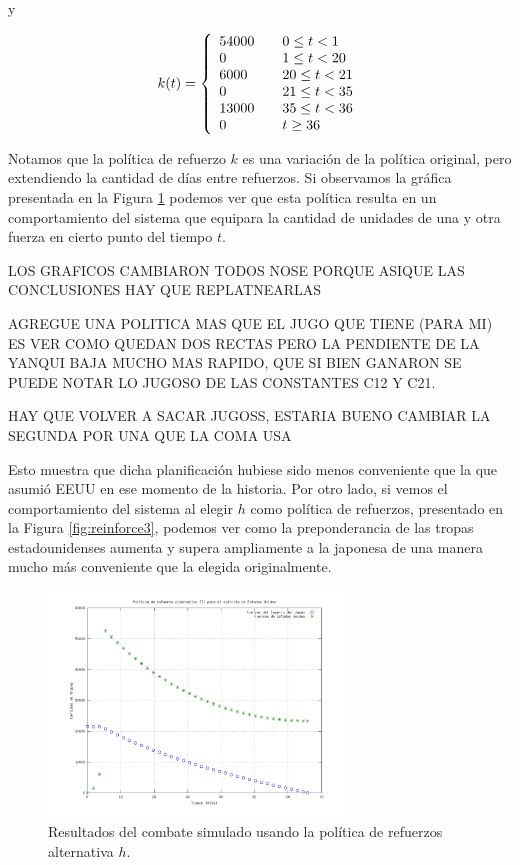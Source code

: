 \documentclass{sig-alternate}
\begin{document}
y

\begin{equation}
k(t) = \left\{ 
    \begin{array}{l l}
    54000 & \quad 0 \leq t < 1 \\
    0 & \quad 1 \leq t < 20\\
    6000 & \quad 20 \leq t < 21\\
    0 & \quad 21 \leq t < 35\\
    13000 & \quad 35 \leq t < 36\\
    0 & \quad t \geq 36\\
    \end{array} \right.
\end{equation}


Notamos que la política de refuerzo $k$ es una variación de la política original, pero extendiendo la cantidad de días entre refuerzos. Si observamos la gráfica presentada en la Figura \ref{fig:reinforce2} podemos ver que esta política resulta en un comportamiento del sistema
que equipara la cantidad de unidades de una y otra fuerza en cierto punto del tiempo $t$.

LOS GRAFICOS CAMBIARON TODOS NOSE PORQUE ASIQUE LAS CONCLUSIONES HAY QUE REPLATNEARLAS

AGREGUE UNA POLITICA MAS QUE EL JUGO QUE TIENE (PARA MI) ES VER COMO QUEDAN DOS RECTAS PERO LA PENDIENTE DE LA YANQUI
BAJA MUCHO MAS RAPIDO, QUE SI BIEN GANARON SE PUEDE NOTAR LO JUGOSO DE LAS CONSTANTES C12 Y C21.

HAY QUE VOLVER A SACAR JUGOSS, ESTARIA BUENO CAMBIAR LA SEGUNDA POR UNA QUE LA COMA USA

Esto muestra que dicha planificación hubiese sido
menos conveniente que la que asumió EEUU en ese momento de la historia. Por otro lado, si vemos el comportamiento del sistema al elegir $h$
como política de refuerzos, presentado en la Figura \ref{fig:reinforce3}, podemos ver como la preponderancia de las tropas estadounidenses
aumenta y supera ampliamente a la japonesa de una manera mucho más conveniente que la elegida originalmente.

\begin{figure}[h]
\begin{center}
\includegraphics[width=8cm]{reinforce2.png}
\caption{\label{fig:reinforce2}Resultados del combate simulado usando la política de refuerzos alternativa $h$.}
\end{center}
\end{figure}
\end{document}
